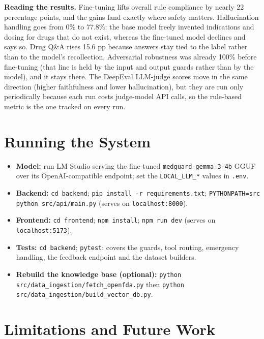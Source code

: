 \documentclass[11pt,a4paper]{article}
\begin{document}
\noindent\textbf{Reading the results.} Fine-tuning lifts overall rule compliance by nearly 22
percentage points, and the gains land exactly where safety matters. Hallucination handling goes from
0\% to 77.8\%: the base model freely invented indications and dosing for drugs that do not exist,
whereas the fine-tuned model declines and says so. Drug Q\&A rises 15.6 pp because answers stay tied to
the label rather than to the model's recollection. Adversarial robustness was already 100\% before
fine-tuning (that line is held by the input and output guards rather than by the model), and it stays there. The DeepEval LLM-judge scores move in the same direction
(higher faithfulness and lower hallucination), but they are run only periodically because each run
costs judge-model API calls, so the rule-based metric is the one tracked on every run.

\section{Running the System}

\begin{itemize}[leftmargin=1.4em,itemsep=3pt,topsep=3pt]
  \item \textbf{Model:} run LM Studio serving the fine-tuned \texttt{medguard-gemma-3-4b} GGUF over its
        OpenAI-compatible endpoint; set the \texttt{LOCAL\_LLM\_*} values in \texttt{.env}.
  \item \textbf{Backend:} \texttt{cd backend}; \texttt{pip install -r requirements.txt};
        \texttt{PYTHONPATH=src python src/api/main.py} (serves on \texttt{localhost:8000}).
  \item \textbf{Frontend:} \texttt{cd frontend}; \texttt{npm install}; \texttt{npm run dev}
        (serves on \texttt{localhost:5173}).
  \item \textbf{Tests:} \texttt{cd backend}; \texttt{pytest}: covers the guards, tool
        routing, emergency handling, the feedback endpoint and the dataset builders.
  \item \textbf{Rebuild the knowledge base (optional):} \texttt{python src/data\_ingestion/fetch\_openfda.py}
        then \texttt{python src/data\_ingestion/build\_vector\_db.py}.
\end{itemize}

\section{Limitations and Future Work}
\end{document}
